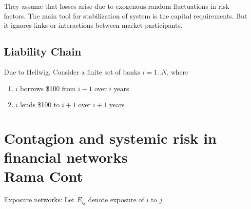They assume that losses arise due to exogenous random fluctuations in risk factors.
The main tool for stabilization of system is the capital requirements.
But it ignores links or interactions between market participants.

\section{Liability Chain}
Due to Hellwig. Consider a finite set of banks $i=1..N$, where
\begin{enumerate}
	\item $i$ borrows \$100 from $i-1$ over $i$ years
	\item $i$ lends \$100 to $i+1$ over $i+1$ years
\end{enumerate}

\chapter{Contagion and systemic risk in financial networks \\ Rama Cont}
Exposure networks: Let $E_{ij}$ denote exposure of $i$ to $j$.


























